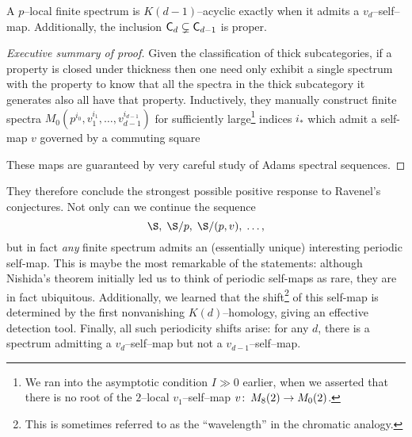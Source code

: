 \begin{theorem}\label{CdEqualsDd}
A $p$--local finite spectrum is $K(d-1)$--acyclic exactly when it admits a $v_d$--self--map.  Additionally, the inclusion $\mathsf{C}_d \subsetneq \mathsf{C}_{d-1}$ is proper.
\end{theorem}
\begin{proof}[Executive summary of proof]
Given the classification of thick subcategories, if a property is closed under thickness then one need only exhibit a single spectrum with the property to know that all the spectra in the thick subcategory it generates also all have that property.  Inductively, they manually construct finite spectra $M_0(p^{i_0}, v_1^{i_1}, \ldots, v_{d-1}^{i_{d-1}})$ for sufficiently large\footnote{We ran into the asymptotic condition $I \gg 0$ earlier, when we asserted that there is no root of the $2$--local $v_1$--self--map $v\colon\thinspace M_8(2) \to M_0(2)$.} indices $i_*$ which admit a self-map $v$ governed by a commuting square
\begin{center}
\end{center}
These maps are guaranteed by very careful study of Adams spectral sequences.
\end{proof}

They therefore conclude the strongest possible positive response to Ravenel's conjectures.  Not only can we continue the sequence \[\S, \; \S/p, \; \S/(p, v), \; \ldots,\] but in fact \emph{any} finite spectrum admits an (essentially unique) interesting periodic self-map.  This is maybe the most remarkable of the statements: although Nishida's theorem initially led us to think of periodic self-maps as rare, they are in fact ubiquitous.  Additionally, we learned that the shift\footnote{This is sometimes referred to as the ``wavelength'' in the chromatic analogy.} of this self-map is determined by the first nonvanishing $K(d)$--homology, giving an effective detection tool.  Finally, all such periodicity shifts arise: for any $d$, there is a spectrum admitting a $v_d$--self--map but not a $v_{d-1}$--self--map.








